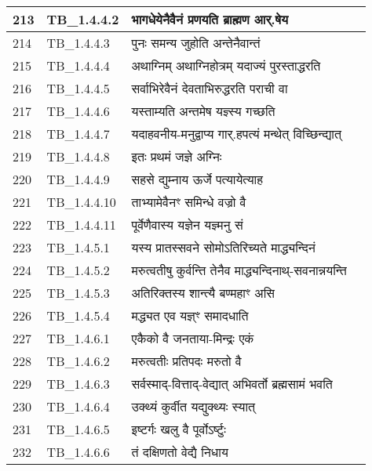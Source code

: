\documentclass[17pt]{extarticle}
\begin{document}
\begin{longtable}{||p{0.4in}||p{0.9in}||p{4.0in}||p{0.9in}||}
        \hline
            213 & TB\_1.4.4.2 & भागधेयेनैवैनं प्रणयति ब्राह्मण आर्.षेय &      \\
        \hline
            214 & TB\_1.4.4.3 & पुनः समन्य जुहोति अन्तेनैवान्तं &      \\
        \hline
            215 & TB\_1.4.4.4 & अथाग्निम् अथाग्निहोत्रम् यदाज्यं पुरस्ताद्धरति &      \\
        \hline
            216 & TB\_1.4.4.5 & सर्वाभिरेवैनं देवताभिरुद्धरति पराची वा &      \\
        \hline
            217 & TB\_1.4.4.6 & यस्ताम्यति अन्तमेष यज्ञ्स्य गच्छति &      \\
        \hline
            218 & TB\_1.4.4.7 & यदाहवनीय{-}मनुद्वाप्य गार्.हपत्यं मन्थेत् विच्छिन्द्यात् &      \\
        \hline
            219 & TB\_1.4.4.8 & इतः प्रथमं जज्ञे अग्निः &      \\
        \hline
            220 & TB\_1.4.4.9 & सहसे द्युम्नाय ऊर्जे पत्यायेत्याह &      \\
        \hline
            221 & TB\_1.4.4.10 & ताभ्यामेवैनꣳ समिन्धे वज्रो वै &      \\
        \hline
            222 & TB\_1.4.4.11 & पूर्वेणैवास्य यज्ञेन यज्ञ्मनु सं &      \\
        \hline
            223 & TB\_1.4.5.1 & यस्य प्रातस्सवने सोमोऽतिरिच्यते माद्ध्यन्दिनं &      \\
        \hline
            224 & TB\_1.4.5.2 & मरुत्वतीषु कुर्वन्ति तेनैव माद्ध्यन्दिनाथ्{-}सवनान्नयन्ति &      \\
        \hline
            225 & TB\_1.4.5.3 & अतिरिक्तस्य शान्त्यै बण्महाꣳ असि &      \\
        \hline
            226 & TB\_1.4.5.4 & मद्ध्यत एव यज्ञ्ꣳ समादधाति &      \\
        \hline
            227 & TB\_1.4.6.1 & एकैको वै जनताया{-}मिन्द्रः एकं &      \\
        \hline
            228 & TB\_1.4.6.2 & मरुत्वतीः प्रतिपदः मरुतो वै &      \\
        \hline
            229 & TB\_1.4.6.3 & सर्वस्माद्{-}वित्ताद्{-}वेद्यात् अभिवर्तो ब्रह्मसामं भवति &      \\
        \hline
            230 & TB\_1.4.6.4 & उक्थ्यं कुर्वीत यद्युक्थ्यः स्यात् &      \\
        \hline
            231 & TB\_1.4.6.5 & इष्टर्गः खलु वै पूर्वोऽर्ष्टुः &      \\
        \hline
            232 & TB\_1.4.6.6 & तं दक्षिणतो वेद्यै निधाय &      \\

\end{longtable}
\end{document}
